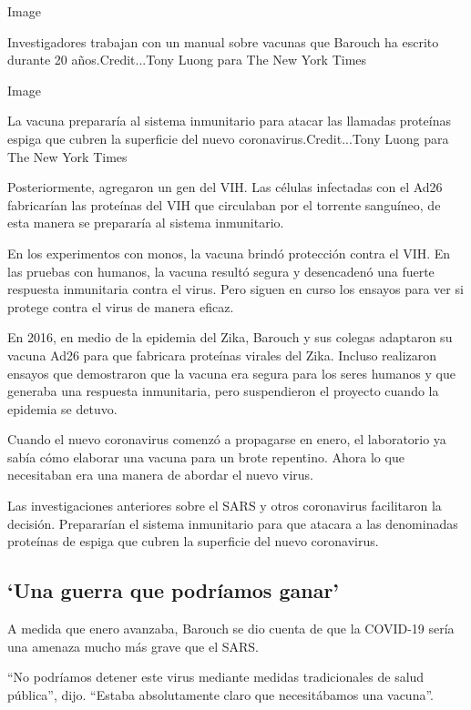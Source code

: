 Image

Investigadores trabajan con un manual sobre vacunas que Barouch ha
escrito durante 20 años.Credit...Tony Luong para The New York Times

Image

La vacuna prepararía al sistema inmunitario para atacar las llamadas
proteínas espiga que cubren la superficie del nuevo
coronavirus.Credit...Tony Luong para The New York Times

Posteriormente, agregaron un gen del VIH. Las células infectadas con el
Ad26 fabricarían las proteínas del VIH que circulaban por el torrente
sanguíneo, de esta manera se prepararía al sistema inmunitario.

En los experimentos con monos, la vacuna brindó protección contra el
VIH. En las pruebas con humanos, la vacuna resultó segura y desencadenó
una fuerte respuesta inmunitaria contra el virus. Pero siguen en curso
los ensayos para ver si protege contra el virus de manera eficaz.

En 2016, en medio de la epidemia del Zika, Barouch y sus colegas
adaptaron su vacuna Ad26 para que fabricara proteínas virales del Zika.
Incluso realizaron ensayos que demostraron que la vacuna era segura para
los seres humanos y que generaba una respuesta inmunitaria, pero
suspendieron el proyecto cuando la epidemia se detuvo.

Cuando el nuevo coronavirus comenzó a propagarse en enero, el
laboratorio ya sabía cómo elaborar una vacuna para un brote repentino.
Ahora lo que necesitaban era una manera de abordar el nuevo virus.

Las investigaciones anteriores sobre el SARS y otros coronavirus
facilitaron la decisión. Prepararían el sistema inmunitario para que
atacara a las denominadas proteínas de espiga que cubren la superficie
del nuevo coronavirus.

\hypertarget{una-guerra-que-podruxedamos-ganar}{%
\subsection{`Una guerra que podríamos
ganar'}\label{una-guerra-que-podruxedamos-ganar}}

A medida que enero avanzaba, Barouch se dio cuenta de que la COVID-19
sería una amenaza mucho más grave que el SARS.

``No podríamos detener este virus mediante medidas tradicionales de
salud pública'', dijo. ``Estaba absolutamente claro que necesitábamos
una vacuna''.


